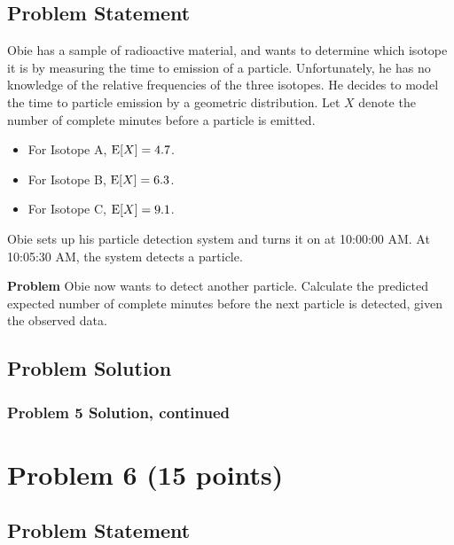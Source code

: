 \documentclass[12pt]{article}
\theoremstyle{definition}
\begin{document}
\subsection*{Problem Statement}

Obie has a sample of radioactive material, and wants to determine which isotope it is by measuring the time to emission of a particle. Unfortunately, he has no knowledge of the relative frequencies of the three isotopes. He decides to model the time to particle emission by a geometric distribution. Let $X$ denote the number of complete minutes before a particle is emitted.
\begin{itemize}
	\item For Isotope A, $\hbox{E}[X] = 4.7$.
	\item For Isotope B, $\hbox{E}[X] = 6.3$.
	\item For Isotope C, $\hbox{E}[X] = 9.1$.
\end{itemize}
Obie sets up his particle detection system and turns it on at 10:00:00 AM. At 10:05:30 AM, the system detects a particle.

\bigskip
\noindent
{\bf Problem} Obie now wants to detect another particle. Calculate the predicted expected number of complete minutes before the next particle is detected, given the observed data.

\subsection*{Problem Solution}


\newpage
\subsubsection*{Problem 5 Solution, continued}


\newpage
\section*{Problem 6 (15 points)}

\subsection*{Problem Statement}
\end{document}
